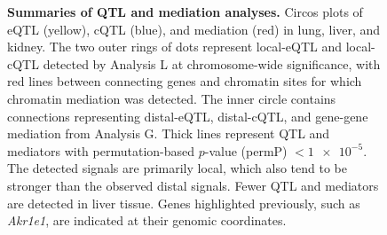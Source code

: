 \documentclass[10pt,letterpaper]{article}
\begin{document}
\begin{figure}[h!]
\caption{\textbf{Summaries of QTL and mediation analyses.} Circos plots of eQTL (yellow), cQTL (blue), and mediation (red) in lung, liver, and kidney. The two outer rings of dots represent local-eQTL and local-cQTL detected by Analysis L at chromosome-wide significance, with red lines between connecting genes and chromatin sites for which chromatin mediation was detected. The inner circle contains connections representing distal-eQTL, distal-cQTL, and gene-gene mediation from Analysis G. Thick lines represent QTL and mediators with permutation-based $p$-value (permP) $< \num{1e-5}$. The detected signals are primarily local, which also tend to be stronger than the observed distal signals. Fewer QTL and mediators are detected in liver tissue. 
Genes highlighted previously, such as \textit{Akr1e1}, are indicated at their genomic coordinates.
\label{fig:circos_plot}}
\end{figure}
\end{document}
